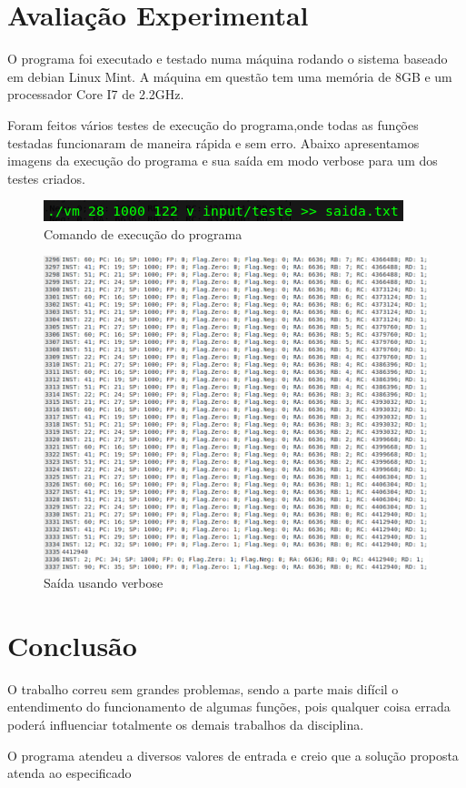 \documentclass[12pt]{article}
\begin{document}
\section{Avaliação Experimental}
\label{avaliacao_experimenta}
O programa foi executado e testado numa máquina rodando o sistema baseado em
debian Linux Mint. A máquina em questão tem uma memória de 8GB e um processador
Core I7 de 2.2GHz.

Foram feitos vários testes de execução do programa,onde todas as funções
testadas funcionaram de maneira rápida e sem erro. Abaixo apresentamos imagens
da execução do programa e sua saída em modo verbose para um dos testes criados.

\begin{figure}[h!]
\centering
 \includegraphics[scale=0.5]{./img/exec.png}
   \caption{Comando de execução do programa}
\end{figure}

\begin{figure}[h!]
\centering
 \includegraphics[scale=0.5]{./img/teste.png}
 \caption{Saída usando verbose}
\end{figure}

\section{Conclusão}
\label{conclusao}
O trabalho correu sem grandes problemas, sendo a parte mais difícil o
entendimento do funcionamento de algumas funções, pois qualquer coisa errada
poderá influenciar totalmente os demais trabalhos da disciplina.

O programa atendeu a diversos valores de entrada e creio que a solução proposta
atenda ao especificado
\end{document}
